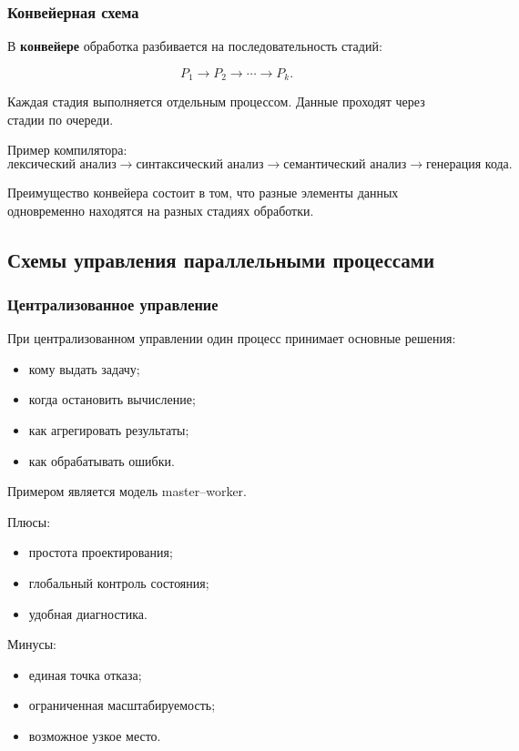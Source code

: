 \documentclass[12pt,a4paper]{article}
\begin{document}
\subsubsection{Конвейерная схема}

В \textbf{конвейере} обработка разбивается на последовательность стадий:

\[
P_1 \rightarrow P_2 \rightarrow \cdots \rightarrow P_k.
\]

Каждая стадия выполняется отдельным процессом. Данные проходят через стадии по очереди.

Пример компилятора:
\[
\text{лексический анализ}
\rightarrow
\text{синтаксический анализ}
\rightarrow
\text{семантический анализ}
\rightarrow
\text{генерация кода}.
\]

Преимущество конвейера состоит в том, что разные элементы данных одновременно находятся на разных стадиях обработки.

\subsection{Схемы управления параллельными процессами}

\subsubsection{Централизованное управление}

При централизованном управлении один процесс принимает основные решения:
\begin{itemize}
    \item кому выдать задачу;
    \item когда остановить вычисление;
    \item как агрегировать результаты;
    \item как обрабатывать ошибки.
\end{itemize}

Примером является модель master--worker.

Плюсы:
\begin{itemize}
    \item простота проектирования;
    \item глобальный контроль состояния;
    \item удобная диагностика.
\end{itemize}

Минусы:
\begin{itemize}
    \item единая точка отказа;
    \item ограниченная масштабируемость;
    \item возможное узкое место.
\end{itemize}
\end{document}
